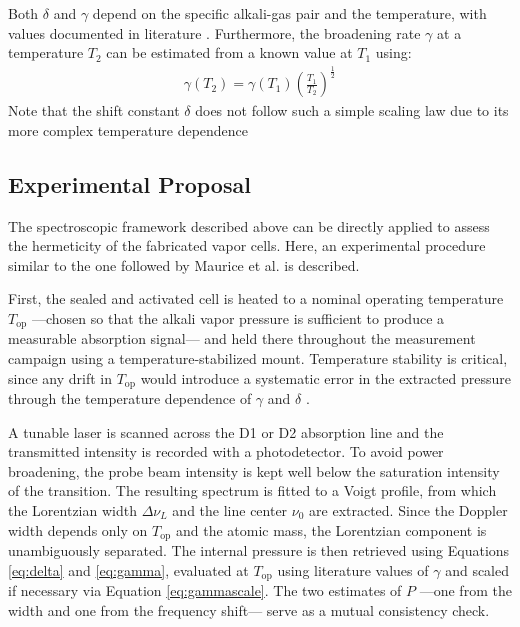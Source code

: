 Both $\delta$ and $\gamma$ depend on the specific 
alkali-gas pair and the temperature, with values documented 
in literature 
\cite{pitz2009, pitz2010, andalkar2002, pitz2014, shi2019}.
 Furthermore, the broadening rate $\gamma$ at a temperature
  $T_2$ can be estimated from a known value at $T_1$ using:
\begin{align}
    \gamma(T_2) = \gamma(T_1)\left(\frac{T_1}{T_2}\right)^{\frac{1}{2}}
     \label{eq:gammascale}
\end{align}
Note that the shift constant $\delta$ does not
follow such a simple scaling law due to its more complex 
temperature dependence \cite{pitz2009} 
\subsection{Experimental Proposal}
The spectroscopic framework described above can be directly 
applied to assess the hermeticity of the fabricated vapor 
cells. Here, an experimental procedure similar to the one
followed by Maurice et al.
\cite{maurice2022} is described.

First, the sealed and activated cell is heated to a nominal operating temperature 
$T_\mathrm{op}$ ---chosen so that the alkali vapor pressure 
is sufficient to produce a measurable absorption signal--- 
and held there throughout the measurement campaign using a 
temperature-stabilized mount. Temperature stability is 
critical, since any drift in $T_\mathrm{op}$ would 
introduce a systematic error in the extracted pressure 
through the temperature dependence of $\gamma$ and $\delta$ 
\cite{pitz2009}.

A tunable laser is scanned across the D1 or D2 
absorption line and the transmitted intensity is recorded 
with a photodetector. To avoid power broadening, the probe 
beam intensity is kept well below the saturation intensity 
of the transition. The resulting spectrum is fitted to a 
Voigt profile, from which the Lorentzian width 
$\Delta\nu_L$ and the line center $\nu_0$ are extracted. 
Since the Doppler width depends only on $T_\mathrm{op}$ 
and the atomic mass, the Lorentzian component is 
unambiguously separated. The internal pressure is then 
retrieved using Equations \ref{eq:delta} and \ref{eq:gamma}, evaluated at 
$T_\mathrm{op}$ using literature values of $\gamma$ and 
scaled if necessary via Equation \ref{eq:gammascale}. 
The two estimates of $P$ ---one from the width and one 
from the frequency shift--- serve as a mutual consistency 
check.

